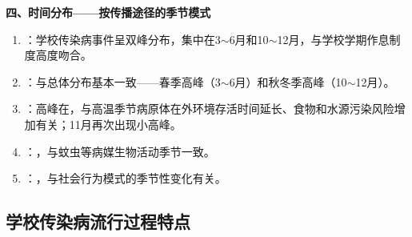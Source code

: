 \begin{keybox}
\textbf{四、时间分布——按传播途径的季节模式}
\begin{enumerate}[leftmargin=*]
    \item {}：学校传染病事件呈双峰分布，集中在3$\sim$6月和10$\sim$12月，与学校学期作息制度高度吻合。
    \item {}：与总体分布基本一致——春季高峰（3$\sim$6月）和秋冬季高峰（10$\sim$12月）。
    \item {}：高峰在，与高温季节病原体在外环境存活时间延长、食物和水源污染风险增加有关；11月再次出现小高峰。
    \item {}：，与蚊虫等病媒生物活动季节一致。
    \item {}：，与社会行为模式的季节性变化有关。
\end{enumerate}
\end{keybox}

\subsection{学校传染病流行过程特点}

